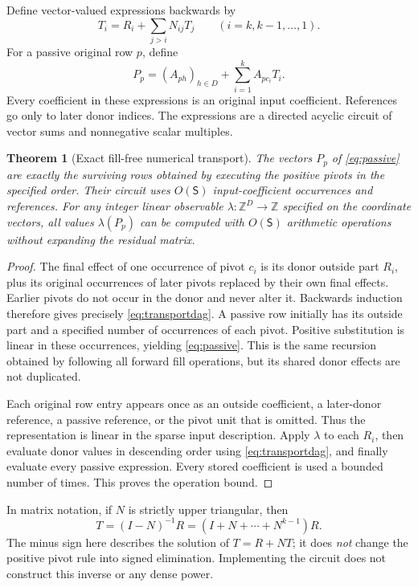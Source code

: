 \documentclass[11pt,letterpaper]{article}
\newtheorem{theorem}{Theorem}[section]
\theoremstyle{definition}
\theoremstyle{remark}
\newcommand{\ZZ}{\mathbb Z}
\newcommand{\size}{\mathsf S}
\begin{document}
Define vector-valued expressions backwards by
\begin{equation}
 T_i=R_i+\sum_{j>i}N_{ij}T_j\qquad(i=k,k-1,\ldots,1).
 \label{eq:transportdag}
\end{equation}
For a passive original row $p$, define
\begin{equation}
 P_p=(A_{ph})_{h\in D}+\sum_{i=1}^k A_{p c_i}T_i.
 \label{eq:passive}
\end{equation}
Every coefficient in these expressions is an original input coefficient. References go only to later donor indices. The expressions are a directed acyclic circuit of vector sums and nonnegative scalar multiples.

\begin{theorem}[Exact fill-free numerical transport]
\label{thm:transport}
The vectors $P_p$ of \cref{eq:passive} are exactly the surviving rows obtained by executing the positive pivots in the specified order. Their circuit uses $O(\size)$ input-coefficient occurrences and references. For any integer linear observable $\lambda:\ZZ^D\to\ZZ$ specified on the coordinate vectors, all values $\lambda(P_p)$ can be computed with $O(\size)$ arithmetic operations without expanding the residual matrix.
\end{theorem}
\begin{proof}
The final effect of one occurrence of pivot $c_i$ is its donor outside part $R_i$, plus its original occurrences of later pivots replaced by their own final effects. Earlier pivots do not occur in the donor and never alter it. Backwards induction therefore gives precisely \cref{eq:transportdag}. A passive row initially has its outside part and a specified number of occurrences of each pivot. Positive substitution is linear in these occurrences, yielding \cref{eq:passive}. This is the same recursion obtained by following all forward fill operations, but its shared donor effects are not duplicated.

Each original row entry appears once as an outside coefficient, a later-donor reference, a passive reference, or the pivot unit that is omitted. Thus the representation is linear in the sparse input description. Apply $\lambda$ to each $R_i$, then evaluate donor values in descending order using \cref{eq:transportdag}, and finally evaluate every passive expression. Every stored coefficient is used a bounded number of times. This proves the operation bound.
\end{proof}

In matrix notation, if $N$ is strictly upper triangular, then
\[
 T=(I-N)^{-1}R=(I+N+\cdots+N^{k-1})R.
\]
The minus sign here describes the solution of $T=R+NT$; it does \emph{not} change the positive pivot rule into signed elimination. Implementing the circuit does not construct this inverse or any dense power.
\end{document}
